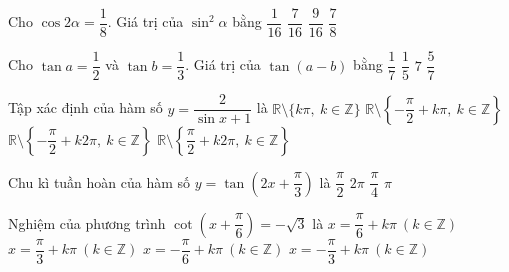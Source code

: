\setcounter{ex}{0}

\begin{ex}
	Cho $\cos 2\alpha = \dfrac{1}{8}$. Giá trị của $\sin^2\alpha$ bằng
	\choice
	{$\dfrac{1}{16}$}
	{\True $\dfrac{7}{16}$}
	{$\dfrac{9}{16}$}
	{$\dfrac{7}{8}$}
\end{ex}

\begin{ex}
	Cho $\tan a = \dfrac{1}{2}$ và $\tan b = \dfrac{1}{3}$. Giá trị của $\tan(a - b)$ bằng
	\choice
	{\True $\dfrac{1}{7}$}
	{$\dfrac{1}{5}$}
	{$7$}
	{$\dfrac{5}{7}$}
\end{ex}

\begin{ex}
	Tập xác định của hàm số $y = \dfrac{2}{\sin x + 1}$ là
	\choice
	{$\mathbb{R} \setminus \{k\pi,\ k \in \mathbb{Z}\}$}
	{$\mathbb{R} \setminus \left\{-\dfrac{\pi}{2} + k\pi,\ k \in \mathbb{Z}\right\}$}
	{\True $\mathbb{R} \setminus \left\{-\dfrac{\pi}{2} + k2\pi,\ k \in \mathbb{Z}\right\}$}
	{$\mathbb{R} \setminus \left\{\dfrac{\pi}{2} + k2\pi,\ k \in \mathbb{Z}\right\}$}
\end{ex}

\begin{ex}
	Chu kì tuần hoàn của hàm số $y = \tan\left(2x + \dfrac{\pi}{3}\right)$ là
	\choice
	{\True $\dfrac{\pi}{2}$}
	{$2\pi$}
	{$\dfrac{\pi}{4}$}
	{$\pi$}
\end{ex}

\begin{ex}
	Nghiệm của phương trình $\cot\left(x + \dfrac{\pi}{6}\right) = -\sqrt{3}$ là
	\choice
	{$x = \dfrac{\pi}{6} + k\pi\ (k \in \mathbb{Z})$}
	{$x = \dfrac{\pi}{3} + k\pi\ (k \in \mathbb{Z})$}
	{$x = -\dfrac{\pi}{6} + k\pi\ (k \in \mathbb{Z})$}
	{\True $x = -\dfrac{\pi}{3} + k\pi\ (k \in \mathbb{Z})$}
\end{ex}

